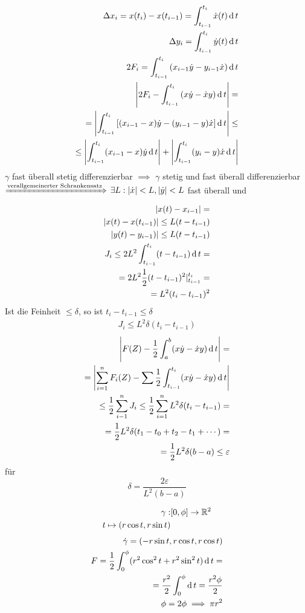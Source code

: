 \begin{Bew}
  \begin{align*}
    \Delta x_i=x(t_i)-x(t_{i-1})=\int^{t_i}_{t_{i-1}}\dot x(t)\operatorname{d} t\\
    \Delta y_i=\int^{t_i}_{t_{i-1}}\dot y(t)\operatorname{d} t\\
    2F_i=\int^{t_i}_{t_{i-1}}\left( x_{i-1}\dot y-y_{i-1}\dot x \right)\operatorname{d} t\\
    \left| 2F_i-\int^{t_i}_{t_{i-1}}\left( x\dot y-\dot x y\right)\operatorname{d} t \right|=\\
    =\left| \int^{t_i}_{t_{i-1}}\left[ (x_{i-1}-x)\dot y-(y_{i-1}-y)\dot x \right]\operatorname{d} t \right|\leq\\
    \leq \left| \int^{t_i}_{t_{i-1}}(x_{i-1}-x)\dot y\operatorname{d} t  \right|+\left| \int^{t_i}_{t_{i-1}}(y_i-y)\dot x\operatorname{d} t \right|\\
  \end{align*}
  $\gamma$ fast überall stetig differenzierbar $\implies$ $\gamma$ stetig und fast überall differenzierbar $\xRightarrow{\text{verallgemeinerter Schrankensatz}}$ $\exists L:\left| \dot x \right|<L, \left| \dot y \right|<L$ fast überall und
  \begin{align*}
    \left| x(t)-x_{i-1} \right|=\\
    \left| x(t)-x(t_{i-1}) \right|\leq L(t-t_{i-1})\\
    \left| y(t)-y_{i-1}) \right|\leq L(t-t_{i-1})\\
    J_i\leq 2L^2\int^{t_i}_{t_{i-1}}(t-t_{i-1})\operatorname{d} t=\\
    =2L^2\frac{1}{2}(t-t_{i-1})^2|^{t_i}_{t_{i-1}}=\\
    =L^2(t_i-t_{i-1})^2
  \end{align*}
  Ist die Feinheit $\leq \delta$, so ist $t_i-t_{i-1}\leq \delta$
  \begin{align*}
    J_i\leq L^2\delta(t_i-t_{i-1})
  \end{align*}
  \begin{align*}
    \left| F(Z)-\frac{1}{2}\int^b_a(x\dot y-\dot xy)\operatorname{d} t \right|=\\
    =\left| \sum_{i=1}^nF_i(Z)-\sum\frac{1}{2}\int^{t_i}_{t_{i-1}}(x\dot y-\dot xy)\operatorname{d} t \right|\\
    \leq \frac{1}{2}\sum^n_{i-1}J_i\leq \frac{1}{2}\sum^n_{i=1}L^2\delta(t_i-t_{i-1})=\\
    =\frac{1}{2}L^2\delta(t_1-t_0+t_2-t_1+\cdots)=\\
    =\frac{1}{2}L^2\delta(b-a)\leq \varepsilon
  \end{align*}
  für
  \[\delta=\frac{2\varepsilon}{L^2(b-a)}\]
\end{Bew}
\begin{Bsp}
  \begin{align*}
    \gamma:&[0,\phi]\to\mathbb{R}^2\\
    t\mapsto(r\cos t,r\sin t)
  \end{align*}
  \begin{align*}
    \dot\gamma=(-r\sin t, r\cos t,r\cos t)\\
    F=\frac{1}{2}\int_0^\phi(r^2\cos^2t+r^2\sin^2t)\operatorname{d} t=\\
    =\frac{r^2}{2}\int^\phi_0\operatorname{d} t=\frac{r^2\phi}{2}\\
    \phi=2\phi \implies \pi r^2
  \end{align*}
\end{Bsp}
